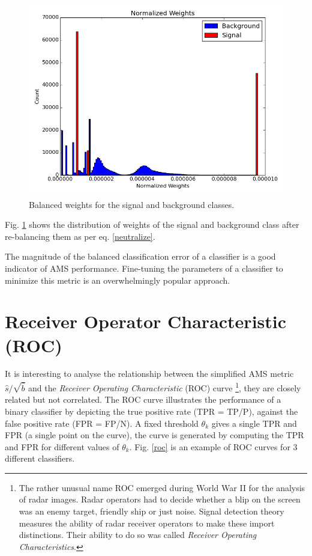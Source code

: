 \begin{figure}
\includegraphics[width=\textwidth]{images/bweights.png}
\caption{Balanced weights for the signal and background classes.}
\label{bweights}
\end{figure}

Fig. \ref{bweights} shows the distribution of weights of the signal and background class after re-balancing them as per eq. \ref{neutralize}.

The magnitude of the balanced classification error of a classifier is a good indicator of AMS performance. Fine-tuning the parameters of a classifier to minimize this metric is an overwhelmingly popular approach. 

\section{Receiver Operator Characteristic (ROC)}

It is interesting to analyse the relationship between the simplified AMS metric $\hat{s}/\sqrt{\hat{b}}$ and the \textit{Receiver Operating Characteristic} (ROC) curve \footnote{The rather unusual name ROC emerged during World War II for the analysis of radar images. Radar operators had to decide whether a blip on the screen was an enemy target, friendly ship or just noise. Signal detection theory measures the ability of radar receiver operators to make these import distinctions. Their ability to do so was called \textit{Receiver Operating Characteristics}.}, they are closely related but not correlated. The ROC curve illustrates the performance of a binary classifier by depicting the true positive rate (TPR = TP/P), against the false positive rate (FPR = FP/N). A fixed threshold $\theta_{k}$ gives a single TPR and FPR (a single point on the curve), the curve is generated by computing the TPR and FPR for different values of $\theta_{k}$. Fig. \ref{roc} is an example of ROC curves for 3 different classifiers. 

